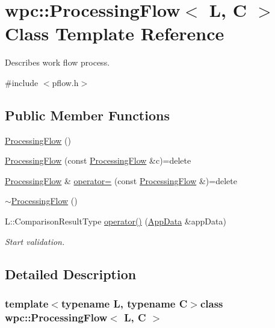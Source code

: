 \hypertarget{classwpc_1_1_processing_flow}{\section{wpc\-:\-:Processing\-Flow$<$ L, C $>$ Class Template Reference}
\label{classwpc_1_1_processing_flow}
}


Describes work flow process.  




{\ttfamily \#include $<$pflow.\-h$>$}

\subsection*{Public Member Functions}
\begin{DoxyCompactItemize}
\item 
\hyperlink{classwpc_1_1_processing_flow_ac0516e42677a414f6675a1e9b899ca78}{Processing\-Flow} ()
\item 
\hyperlink{classwpc_1_1_processing_flow_ac0d5211e0c8f4df83419228bd91cda51}{Processing\-Flow} (const \hyperlink{classwpc_1_1_processing_flow}{Processing\-Flow} \&c)=delete
\item 
\hyperlink{classwpc_1_1_processing_flow}{Processing\-Flow} \& \hyperlink{classwpc_1_1_processing_flow_acff326f3c685553de264e6f2d9631611}{operator=} (const \hyperlink{classwpc_1_1_processing_flow}{Processing\-Flow} \&)=delete
\item 
\hyperlink{classwpc_1_1_processing_flow_afb60fc68e505f1f7b0c1c2263b1b4e3a}{$\sim$\-Processing\-Flow} ()
\item 
L\-::\-Comparison\-Result\-Type \hyperlink{classwpc_1_1_processing_flow_a7c76ea30de1863e5a5b82325a0a3616f}{operator()} (\hyperlink{structwpc_1_1_app_data}{App\-Data} \&app\-Data)
\begin{DoxyCompactList}\small\item\em Start validation. \end{DoxyCompactList}\end{DoxyCompactItemize}


\subsection{Detailed Description}
\subsubsection*{template$<$typename L, typename C$>$class wpc\-::\-Processing\-Flow$<$ L, C $>$}

